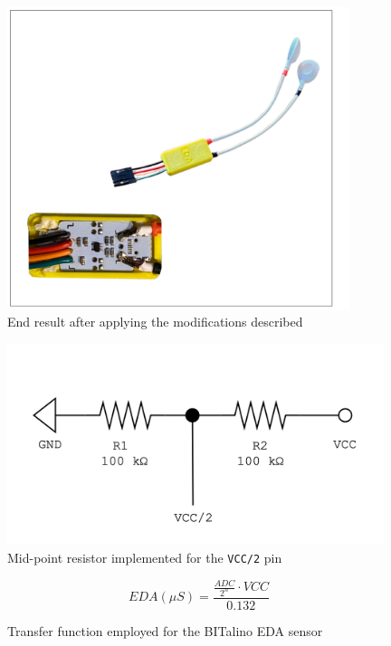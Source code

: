 \begin{figure}
    \centering
    \includegraphics[width=10cm]{./images/full-sensor-view.drawio.png}
    \caption{End result after applying the modifications described}
    \label{fig:full-sensor-configuration}
\end{figure}

\begin{figure}
    \centering
    \includegraphics[width=11cm]{./images/midpoint-resistor.drawio.png}
    \caption{Mid-point resistor implemented for the \texttt{VCC/2} pin}
    \label{fig:voltage-divider-schema}
\end{figure}

\begin{figure}
    \begingroup
    \Large
    \begin{equation}
    EDA(\mu S) = \frac{\frac{ADC}{2^n} \cdot VCC}{0.132}
    \end{equation}
    \caption{Transfer function employed for the BITalino EDA sensor}
    \label{fig:bitalino-transfer-function}
    \endgroup
\end{figure}

\pagebreak


